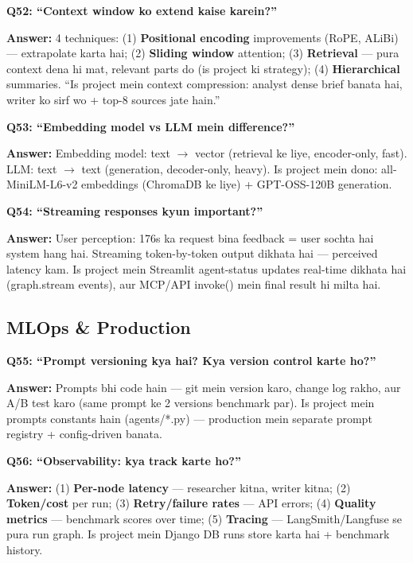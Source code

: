 \begin{interviewbox}
\textbf{Q52: ``Context window ko extend kaise karein?''}

\textbf{Answer:} 4 techniques: (1) \textbf{Positional encoding} improvements (RoPE, ALiBi) --- extrapolate karta hai; (2) \textbf{Sliding window} attention; (3) \textbf{Retrieval} --- pura context dena hi mat, relevant parts do (is project ki strategy); (4) \textbf{Hierarchical} summaries. ``Is project mein context compression: analyst dense brief banata hai, writer ko sirf wo + top-8 sources jate hain.''
\end{interviewbox}

\begin{interviewbox}
\textbf{Q53: ``Embedding model vs LLM mein difference?''}

\textbf{Answer:} Embedding model: text $\rightarrow$ vector (retrieval ke liye, encoder-only, fast). LLM: text $\rightarrow$ text (generation, decoder-only, heavy). Is project mein dono: all-MiniLM-L6-v2 embeddings (ChromaDB ke liye) + GPT-OSS-120B generation.
\end{interviewbox}

\begin{interviewbox}
\textbf{Q54: ``Streaming responses kyun important?''}

\textbf{Answer:} User perception: 176s ka request bina feedback = user sochta hai system hang hai. Streaming token-by-token output dikhata hai --- perceived latency kam. Is project mein Streamlit agent-status updates real-time dikhata hai (graph.stream events), aur MCP/API invoke() mein final result hi milta hai.
\end{interviewbox}

\subsection{MLOps \& Production}

\begin{interviewbox}
\textbf{Q55: ``Prompt versioning kya hai? Kya version control karte ho?''}

\textbf{Answer:} Prompts bhi code hain --- git mein version karo, change log rakho, aur A/B test karo (same prompt ke 2 versions benchmark par). Is project mein prompts constants hain (agents/*.py) --- production mein separate prompt registry + config-driven banata.
\end{interviewbox}

\begin{interviewbox}
\textbf{Q56: ``Observability: kya track karte ho?''}

\textbf{Answer:} (1) \textbf{Per-node latency} --- researcher kitna, writer kitna; (2) \textbf{Token/cost} per run; (3) \textbf{Retry/failure rates} --- API errors; (4) \textbf{Quality metrics} --- benchmark scores over time; (5) \textbf{Tracing} --- LangSmith/Langfuse se pura run graph. Is project mein Django DB runs store karta hai + benchmark history.
\end{interviewbox}

